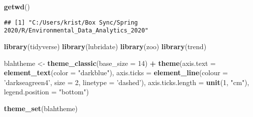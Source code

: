 \documentclass[
]{article}
\newenvironment{Shaded}{\begin{snugshade}}{\end{snugshade}}
\newcommand{\DataTypeTok}[1]{\textcolor[rgb]{0.13,0.29,0.53}{#1}}
\newcommand{\DecValTok}[1]{\textcolor[rgb]{0.00,0.00,0.81}{#1}}
\newcommand{\KeywordTok}[1]{\textcolor[rgb]{0.13,0.29,0.53}{\textbf{#1}}}
\newcommand{\NormalTok}[1]{#1}
\newcommand{\OperatorTok}[1]{\textcolor[rgb]{0.81,0.36,0.00}{\textbf{#1}}}
\newcommand{\StringTok}[1]{\textcolor[rgb]{0.31,0.60,0.02}{#1}}
\begin{document}
\begin{Shaded}
\begin{Highlighting}[]
\KeywordTok{getwd}\NormalTok{()}
\end{Highlighting}
\end{Shaded}

\begin{verbatim}
## [1] "C:/Users/krist/Box Sync/Spring 2020/R/Environmental_Data_Analytics_2020"
\end{verbatim}

\begin{Shaded}
\begin{Highlighting}[]
\KeywordTok{library}\NormalTok{(tidyverse)}
\KeywordTok{library}\NormalTok{(lubridate)}
\KeywordTok{library}\NormalTok{(zoo)}
\KeywordTok{library}\NormalTok{(trend)}

\NormalTok{blahtheme <-}\StringTok{ }\KeywordTok{theme_classic}\NormalTok{(}\DataTypeTok{base_size =} \DecValTok{14}\NormalTok{) }\OperatorTok{+}
\StringTok{  }\KeywordTok{theme}\NormalTok{(}\DataTypeTok{axis.text =} \KeywordTok{element_text}\NormalTok{(}\DataTypeTok{color =} \StringTok{"darkblue"}\NormalTok{), }\DataTypeTok{axis.ticks =} \KeywordTok{element_line}\NormalTok{(}\DataTypeTok{colour =} \StringTok{'darkseagreen4'}\NormalTok{, }\DataTypeTok{size =} \DecValTok{2}\NormalTok{, }\DataTypeTok{linetype =} \StringTok{'dashed'}\NormalTok{), }\DataTypeTok{axis.ticks.length =} \KeywordTok{unit}\NormalTok{(}\DecValTok{1}\NormalTok{, }\StringTok{"cm"}\NormalTok{),}
        \DataTypeTok{legend.position =} \StringTok{"bottom"}\NormalTok{)}
  
\KeywordTok{theme_set}\NormalTok{(blahtheme)   }


\end{Highlighting}
\end{Shaded}
\end{document}
